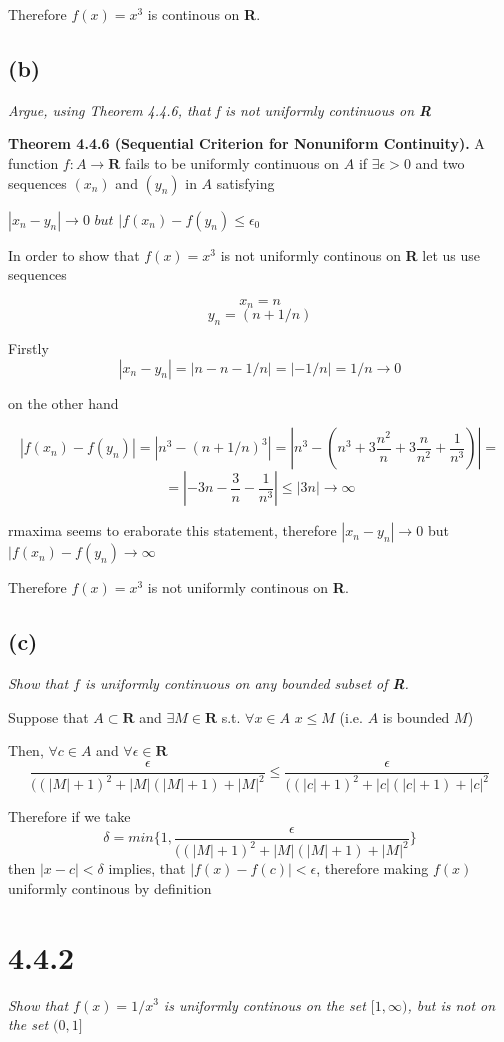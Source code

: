\documentclass[11pt,oneside,titlepage]{article}
\begin{document}
Therefore $f(x) = x ^3$ is continous on \textbf{R}.

\subsection*{(b)}
\textit{Argue, using Theorem 4.4.6, that f is not uniformly continuous
  on \textbf{R}}


\textbf{Theorem 4.4.6 (Sequential Criterion for Nonuniform Continuity).} A
function $f:A \to \textbf{R}$ fails to be uniformly continuous on $A$ if
$\exists \epsilon > 0 $ and  two sequences $(x_n)$ and $(y_n)$ in $A$
satisfying

$|x_n - y_n| \to 0$ $but$ $|f(x_n) - f(y_n) \leq \epsilon_0$

In order to show that $f(x) = x^3$ is not uniformly continous on
\textbf{R} let us use sequences

$$x_n = n$$
$$y_n = (n + 1/n)$$

Firstly
$$ |x_n - y_n| = |n - n - 1/n| = |-1/n| = 1/n \to 0$$

on the other hand

$$|f(x_n) - f(y_n)| = |n ^ 3 - (n + 1/n) ^ 3| = |n^3 - (n^3 + 3 \frac{n^2}{n}
+ 3 \frac{n}{n^2} + \frac{1}{n^3})| = $$
$$ = |-3n - \frac{3}{n} - \frac{1}{n^3} | \leq |3n| \to \infty$$

rmaxima seems to eraborate this statement, therefore  $|x_n - y_n| \to 0$
but $|f(x_n) - f(y_n) \to \infty$

Therefore $f(x) = x^3$ is not uniformly continous on \textbf{R}.

\subsection*{(c)}
\textit{Show that $f$ is uniformly continuous on any bounded subset
  of \textbf{R}.}

Suppose that $A \subset \textbf{R}$ and $\exists M \in \textbf{R}$ s.t.
$\forall x \in A$ $x \leq M$ (i.e. $A$ is bounded $M$)

Then, $\forall c \in A$ and $\forall \epsilon \in \textbf{R}$
$$\frac{\epsilon}{((|M| + 1)^{2} + |M|(|M| + 1) + |M|^2}  \leq
\frac{\epsilon}{((|c| + 1)^{2} + |c|(|c| + 1) + |c|^2} $$

Therefore if we take
$$\delta = min\{1, \frac{\epsilon}{((|M| + 1)^{2} + |M|(|M| + 1) + |M|^2}\} $$
then $|x - c| < \delta$ implies, that $ |f(x) - f(c)| < \epsilon$, therefore
making $f(x)$ uniformly continous by definition


\section*{4.4.2}
\textit{Show that $f(x) = 1/x^3$  is uniformly continous on the set
  $[1, \infty)$, but is not on the set $(0, 1]$}
\end{document}
